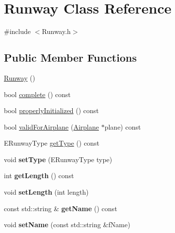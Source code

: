 \hypertarget{classRunway}{}\section{Runway Class Reference}
\label{classRunway}


{\ttfamily \#include $<$Runway.\+h$>$}

\subsection*{Public Member Functions}
\begin{DoxyCompactItemize}
\item 
\hyperlink{classRunway_a75b9355b4953bd430f7c6ea0a18b465a}{Runway} ()
\item 
bool \hyperlink{classRunway_a3f905e251e1c7941690cf89c1fabd04c}{complete} () const 
\item 
bool \hyperlink{classRunway_ab1eb6649c04ead1c6ba6405b0d6e2a9f}{properly\+Initialized} () const 
\item 
bool \hyperlink{classRunway_a54aa6c5f9054cc5d16c10257c641f997}{valid\+For\+Airplane} (\hyperlink{classAirplane}{Airplane} $\ast$plane) const 
\item 
E\+Runway\+Type \hyperlink{classRunway_a6d936a840916f8a5fe01551622cf6c46}{get\+Type} () const 
\item 
void {\bfseries set\+Type} (E\+Runway\+Type type)\hypertarget{classRunway_a0a95f11d67cb4677f1bddd8cf20ed5bc}{}\label{classRunway_a0a95f11d67cb4677f1bddd8cf20ed5bc}

\item 
int {\bfseries get\+Length} () const \hypertarget{classRunway_ab22377036fde6582fa86441e73ad69d2}{}\label{classRunway_ab22377036fde6582fa86441e73ad69d2}

\item 
void {\bfseries set\+Length} (int length)\hypertarget{classRunway_af32954dc4688acd3a91114d200c6df9e}{}\label{classRunway_af32954dc4688acd3a91114d200c6df9e}

\item 
const std\+::string \& {\bfseries get\+Name} () const \hypertarget{classRunway_a2934c38f3af6080f7b40c306a27c57cd}{}\label{classRunway_a2934c38f3af6080f7b40c306a27c57cd}

\item 
void {\bfseries set\+Name} (const std\+::string \&f\+Name)\hypertarget{classRunway_a7c2e26b48213f220676d24dc7e102f4c}{}\label{classRunway_a7c2e26b48213f220676d24dc7e102f4c}


\end{DoxyCompactItemize}
